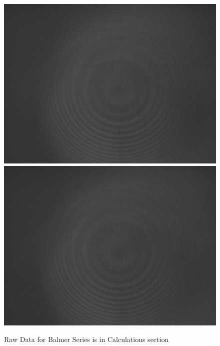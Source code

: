 \documentclass{article}
\begin{document}
\begin{figure}[H]
    \includegraphics[scale = 0.1]{18.jpg}
    \includegraphics[scale = 0.1]{19.jpg}
    \caption{Raw Data for Balmer Series is in Calculations section}
    \label{fig:my_label}
\end{figure}
\end{document}
